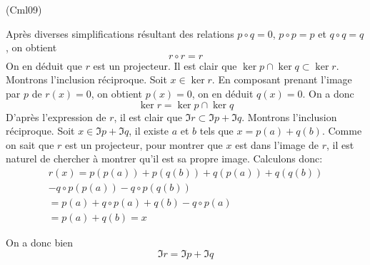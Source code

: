 \begin{tiny}(Cml09)\end{tiny} Après diverses simplifications résultant des relations $p\circ q =0$, $p\circ p=p$ et $q\circ q=q$, on obtient
\begin{displaymath}
 r\circ r = r
\end{displaymath}
On en déduit que $r$ est un projecteur. Il est clair que $\ker p \cap \ker q\subset \ker r$. Montrons l'inclusion réciproque.\newline
Soit $x\in \ker r$. En composant prenant l'image par $p$ de $r(x)=0$, on obtient $p(x)=0$, on en déduit $q(x)=0$. On a donc
\begin{displaymath}
 \ker r = \ker p \cap \ker q
\end{displaymath}
D'après l'expression de $r$, il est clair que $\Im r\subset \Im p + \Im q$. Montrons l'inclusion réciproque.\newline
Soit $x\in \Im p + \Im q$, il existe $a$ et $b$ tels que $x=p(a)+q(b)$. Comme on sait que $r$ est un projecteur, pour montrer que $x$ est dans l'image de $r$, il est naturel de chercher à montrer qu'il est sa propre image. Calculons donc:
\begin{multline*}
 r(x) = p(p(a))+p(q(b))+q(p(a))+q(q(b))\\-q\circ p(p(a))-q\circ p(q(b))\\
= p(a) +q\circ p(a) +q(b)-q\circ p(a)\\ = p(a)+q(b)=x
\end{multline*}

On a donc bien
\begin{displaymath}
 \Im r = \Im p + \Im q
\end{displaymath}
